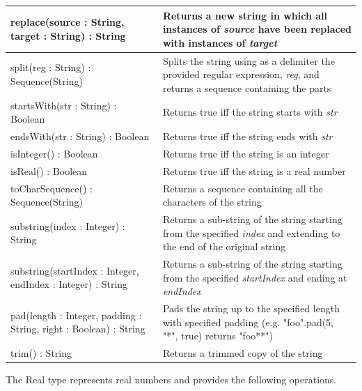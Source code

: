 \begin{longtabu} {|p{6.5cm}|X|}
			replace(source : String, target : String) : String & Returns a new string in which all instances of \emph{source} have been replaced with instances of \emph{target}\\\hline 
			
			split(reg : String) : Sequence(String) & Splits the string using as a delimiter the provided regular expression, \emph{reg}, and returns a sequence containing the parts\\\hline
			
			startsWith(str : String) : Boolean & Returns true iff the string starts with \emph{str}\\\hline
			
			endsWith(str : String) : Boolean & Returns true iff the string ends with \emph{str}\\\hline

			isInteger() : Boolean & Returns true iff the string is an integer\\\hline
			
			isReal() : Boolean & Returns true iff the string is a real number\\\hline
						
			toCharSequence() : Sequence(String) & Returns a sequence containing all the characters of the string\\\hline
			
			substring(index : Integer) : String & Returns a sub-string of the string starting from the specified \emph{index} and extending to the end of the original string\\\hline
			
			substring(startIndex : Integer, endIndex : Integer) : String & Returns a sub-string of the string starting from the specified \emph{startIndex} and ending at \emph{endIndex} \\\hline
			
			pad(length : Integer, padding : String, right : Boolean) : String & Pads the string up to the specified length with specified padding (e.g. "foo".pad(5, "*", true) returns "foo**") \\\hline
			
			trim() : String & Returns a trimmed copy of the string \\\hline			
			
\end{longtabu}

The Real type represents real numbers and provides the following operations.

